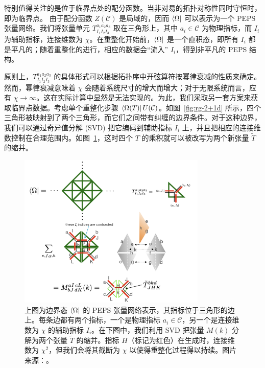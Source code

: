 
特别值得关注的是位于临界点处的配分函数。当非对易的拓扑对称性同时守恒时，即为临界点。
由于配分函数 $Z(\mathcal{C})$ 是局域的，因而 $\bra{\Omega}$ 可以表示为一个 PEPS 张量网络。我们将张量单元 $T^{a_1 a_2 a_3}_{I_1 I_2 I_3}$ 取在三角形上，其中 $a_i\in\mathcal{C}$ 为物理指标，而 $I_i$ 为辅助指标，连接维数为 $\chi$。在重整化开始前，$\bra{\Omega}$ 是一个直积态，即所有 $I_i$ 都是平凡的；随着重整化的进行，相应的数据会“流入” $I_i$，得到非平凡的 PEPS 结构。

原则上，$T^{a_1 a_2 a_3}_{I_1 I_2 I_3}$ 的具体形式可以根据拓扑序中开弦算符按幂律衰减的性质来确定。然而，幂律衰减意味着 $\chi$ 会随着系统尺寸的增大而增大；对于无限系统而言，应有 $\chi\to\infty$。这在实际计算中显然是无法实现的。为此，我们采取另一套方案来获取临界点数据。考虑单个重整化步骤 $\bra{\Omega(T)}U(\mathcal{C})$。如图~\ref{fig:rg-2+1d} 所示，四个三角形被映射到了两个三角形，而它们之间带有纠缠的边界条件。对于这种边界，我们可以通过奇异值分解 (SVD) 把它编码到辅助指标 $I_i$ 上，并且把相应的连接维数控制在合理范围内。如图~\ref{fig:rg-2+1d-blocking}，这时四个 $T$ 的乘积就可以被改写为两个新张量 $\tilde{T}$ 的缩并。

\begin{figure}[htb]
  \centering
  \includegraphics[width=0.8\textwidth]{images/holographic/rg-2+1d-blocking.png}
  \caption[边界态 $\bra{\Omega}$ 的 PEPS 张量网络表示]{上图为边界态 $\bra{\Omega}$ 的 PEPS 张量网络表示，其指标位于三角形的边上。每条边都有两个指标，一个是物理指标 $a_i\in\mathcal{C}$，另一个是连接维数为 $\chi$ 的辅助指标 $I_i$。在下图中，我们利用 SVD 把张量 $M(k)$ 分解为两个张量 $\tilde{T}$ 的缩并。指标 $H$（标记为红色）在生成时，连接维数为 $\chi^2$，但我们会将其截断为 $\chi$ 以使得重整化过程得以持续。图片来源：\parencite{chen2022exact}。}
  \label{fig:rg-2+1d-blocking}
\end{figure}

